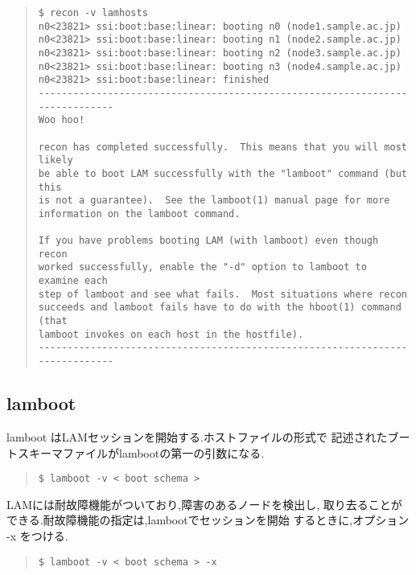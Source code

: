 \documentclass[a4paper,titlepage]{jreport}
\begin{document}
\begin{quote}
\begin{screen}
\begin{verbatim}
$ recon -v lamhosts
n0<23821> ssi:boot:base:linear: booting n0 (node1.sample.ac.jp)
n0<23821> ssi:boot:base:linear: booting n1 (node2.sample.ac.jp)
n0<23821> ssi:boot:base:linear: booting n2 (node3.sample.ac.jp)
n0<23821> ssi:boot:base:linear: booting n3 (node4.sample.ac.jp)
n0<23821> ssi:boot:base:linear: finished
-----------------------------------------------------------------------------
Woo hoo!

recon has completed successfully.  This means that you will most likely
be able to boot LAM successfully with the "lamboot" command (but this
is not a guarantee).  See the lamboot(1) manual page for more
information on the lamboot command.

If you have problems booting LAM (with lamboot) even though recon
worked successfully, enable the "-d" option to lamboot to examine each
step of lamboot and see what fails.  Most situations where recon
succeeds and lamboot fails have to do with the hboot(1) command (that
lamboot invokes on each host in the hostfile).
-----------------------------------------------------------------------------

\end{verbatim}
\end{screen}
\end{quote}

\subsection{lamboot}
lamboot はLAMセッションを開始する.ホストファイルの形式で
記述されたブートスキーマファイルがlambootの第一の引数になる.

\begin{quote}
\begin{screen}
\begin{verbatim}
$ lamboot -v < boot schema >
\end{verbatim}
\end{screen}
\end{quote}

LAMには耐故障機能がついており,障害のあるノードを検出し,
取り去ることができる.耐故障機能の指定は,lambootでセッションを開始
するときに,オプション -x をつける.

\begin{quote}
\begin{screen}
\begin{verbatim}
$ lamboot -v < boot schema > -x
\end{verbatim}
\end{screen}
\end{quote}
\end{document}
